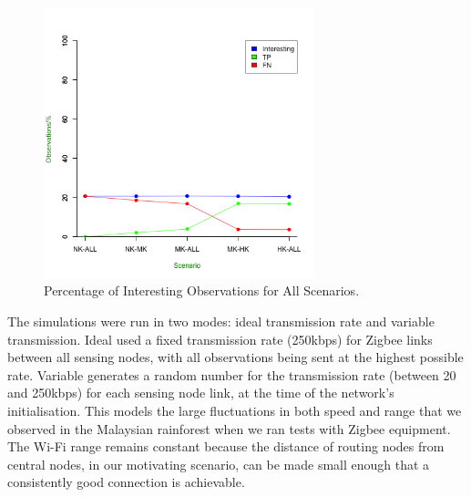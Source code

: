 \begin{figure}[ht!]
	\centering
	\includegraphics[width=0.7\textwidth]{Chap7/figures/ideal/all_int_percent}
	\caption{Percentage of Interesting Observations for All Scenarios.}
	\label{fig:res:ideal:int}
\end{figure}

The simulations were run in two modes: ideal transmission rate and variable transmission. Ideal used a fixed transmission rate (250kbps) for Zigbee links between all sensing nodes, with all observations being sent at the highest possible rate. Variable generates a random number for the transmission rate (between 20 and 250kbps) for each sensing node link, at the time of the network's initialisation. This models the large fluctuations in both speed and range that we observed in the Malaysian rainforest when we ran tests with Zigbee equipment. The Wi-Fi range remains constant because the distance of routing nodes from central nodes, in our motivating scenario, can be made small enough that a consistently good connection is achievable.

